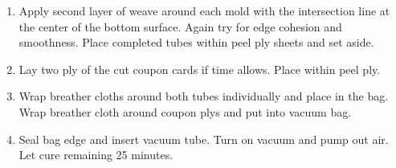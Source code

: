 \documentclass{article}
\begin{document}
\begin{enumerate}
    \item Apply second layer of weave around each mold with the intersection line at the center of the bottom surface. Again try for edge cohesion and smoothness. Place completed tubes within peel ply sheets and set aside.
    \item Lay two ply of the cut coupon cards if time allows. Place within peel ply.
    \item Wrap breather cloths around both tubes individually and place in the bag. Wrap breather cloth around coupon plys and put into vacuum bag.  
    \item Seal bag edge and insert vacuum tube. Turn on vacuum and pump out air. Let cure remaining 25 minutes. 
\end{enumerate}
\end{document}
